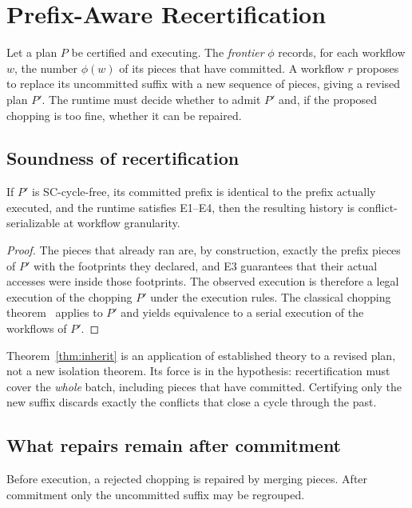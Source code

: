 \section{Prefix-Aware Recertification}
\label{sec:theory}

Let a plan $P$ be certified and executing. The \emph{frontier} $\phi$
records, for each workflow $w$, the number $\phi(w)$ of its pieces that have
committed. A workflow $r$ proposes to replace its uncommitted suffix with a
new sequence of pieces, giving a revised plan $P'$. The runtime must decide
whether to admit $P'$ and, if the proposed chopping is too fine, whether it
can be repaired.

\subsection{Soundness of recertification}

\begin{theorem}
\label{thm:inherit}
If $P'$ is SC-cycle-free, its committed prefix is identical to the prefix
actually executed, and the runtime satisfies E1--E4, then the resulting
history is conflict-serializable at workflow granularity.
\end{theorem}

\begin{proof}
The pieces that already ran are, by construction, exactly the prefix pieces of
$P'$ with the footprints they declared, and E3 guarantees that their actual
accesses were inside those footprints. The observed execution is therefore a
legal execution of the chopping $P'$ under the execution rules. The classical
chopping theorem~\cite{shasha1995chopping} applies to $P'$ and yields
equivalence to a serial execution of the workflows of $P'$.
\end{proof}

Theorem~\ref{thm:inherit} is an application of established theory to a revised
plan, not a new isolation theorem. Its force is in the hypothesis:
recertification must cover the \emph{whole} batch, including pieces that have
committed. Certifying only the new suffix discards exactly the conflicts that
close a cycle through the past.

\subsection{What repairs remain after commitment}

Before execution, a rejected chopping is repaired by merging pieces. After
commitment only the uncommitted suffix may be regrouped.

